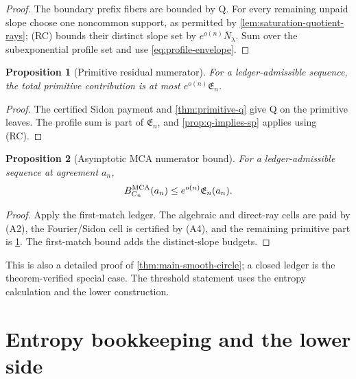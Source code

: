 \documentclass[12pt,a4paper]{amsart}
\numberwithin{equation}{section}
\newtheorem{proposition}[proposition]{Proposition}
\theoremstyle{remark}
\newcommand{\barN}{\overline N}
\begin{document}
\begin{proof}
The boundary prefix fibers are bounded by Q.  For every remaining unpaid
slope choose one noncommon support, as permitted by
\cref{lem:saturation-quotient-rays}; \textup{(RC)} bounds their distinct slope set by
\(e^{o(n)}\barN_\lambda\).  Sum over the subexponential profile set and use
\eqref{eq:profile-envelope}.
\end{proof}

\begin{proposition}[Primitive residual numerator]\label{prop:primitive-residual-numerator}
For a ledger-admissible sequence, the total primitive contribution is at
most \(e^{o(n)}\mathfrak E_n\).
\end{proposition}

\begin{proof}
The certified Sidon payment and \cref{thm:primitive-q} give Q on the
primitive leaves.  The profile sum is part of \(\mathfrak E_n\), and
\cref{prop:q-implies-sp} applies using \textup{(RC)}.
\end{proof}

\begin{proposition}[Asymptotic MCA numerator bound]\label{prop:numerator-bound}
For a ledger-admissible sequence at agreement \(a_n\),
\[
        B_{C_n}^{\rm MCA}(a_n)
        \le e^{o(n)}\mathfrak E_n(a_n).
\]
\end{proposition}

\begin{proof}
Apply the first-match ledger.  The algebraic and direct-ray cells are paid by
\textup{(A2)}, the Fourier/Sidon cell is certified by \textup{(A4)}, and the remaining primitive
part is \cref{prop:primitive-residual-numerator}.  The first-match bound
adds the distinct-slope budgets.
\end{proof}

This is also a detailed proof of \cref{thm:main-smooth-circle}; a closed
ledger is the theorem-verified special case.  The threshold statement uses
the entropy calculation and the lower construction.

\section{Entropy bookkeeping and the lower side}\label{sec:frontier}
\end{document}
